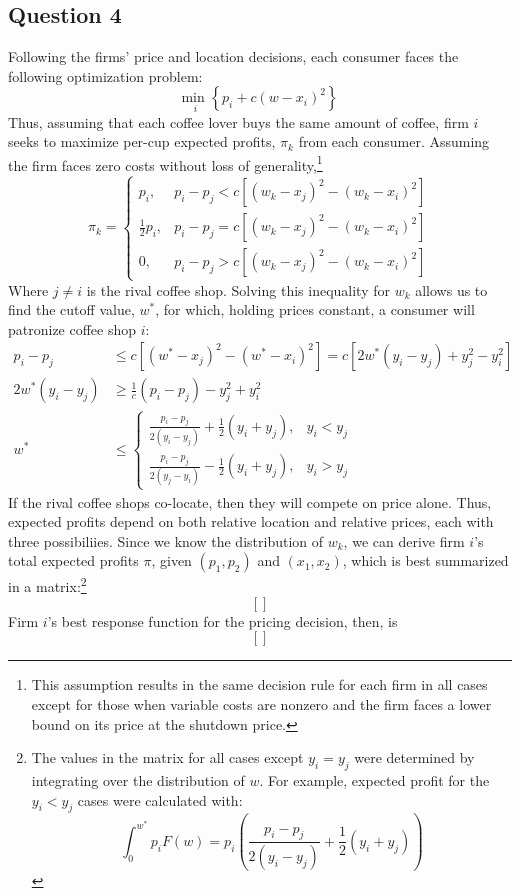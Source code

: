 \documentclass{article}
\newcommand{\usmin}[1]{\underset{#1}{\text{min }}}
\begin{document}
\pagebreak
\subsection*{Question 4}
Following the firms' price and location decisions, each consumer faces the following optimization problem:
\[
	\usmin{i}\left\{p_i + c\left(w-x_i\right)^2\right\}
\]
Thus, assuming that each coffee lover buys the same amount of coffee, firm $i$ seeks to maximize per-cup expected profits, $\pi_k$ from each consumer. Assuming the firm faces zero costs without loss of generality,\footnote{This assumption results in the same decision rule for each firm in all cases except for those when variable costs are nonzero and the firm faces a lower bound on its price at the shutdown price.}
\[
	\pi_k = \begin{cases} 	p_i, & p_i - p_j < c\left[(w_k-x_j)^2 - (w_k-x_i)^2\right] \\ \frac{1}{2}p_i, & p_i - p_j = c\left[(w_k-x_j)^2 - (w_k-x_i)^2\right] \\ 
							0, & p_i - p_j > c\left[(w_k-x_j)^2 - (w_k-x_i)^2\right]	\end{cases}
\]
Where ${j\neq i}$ is the rival coffee shop. Solving this inequality for $w_k$ allows us to find the cutoff value, $w^*$, for which, holding prices constant, a consumer will patronize coffee shop $i$:
\begin{align*}
	p_i - p_j &\leq c\left[(w^*-x_j)^2 - (w^*-x_i)^2\right] = c\left[2w^*(y_i-y_j) + y_j^2-y_i^2\right]	\\
	2w^*(y_i-y_j) &\geq \frac{1}{c}(p_i-p_j) - y_j^2 + y_i^2 	\\
	w^* &\leq 	\begin{cases} 	\frac{p_i - p_j}{2(y_i - y_j)} + \frac{1}{2}(y_i + y_j), & y_i<y_j \\
								\frac{p_i - p_j}{2(y_j - y_i)} - \frac{1}{2}(y_i + y_j), & y_i>y_j
				\end{cases}
\end{align*}
If the rival coffee shops co-locate, then they will compete on price alone. Thus, expected profits depend on both relative location and relative prices, each with three possibiliies. Since we know the distribution of $w_k$, we can derive firm $i$'s total expected profits $\pi$, given $(p_1,p_2)$ and $(x_1,x_2)$, which is best summarized in a matrix:\footnote{The values in the matrix for all cases except ${y_i=y_j}$ were determined by integrating over the distribution of $w$. For example, expected profit for the ${y_i<y_j}$ cases were calculated with: $$ \int_0^{w^*}p_iF(w) = p_i\left(\frac{p_i - p_j}{2(y_i - y_j)} + \frac{1}{2}(y_i + y_j)\right) $$}
\[
	[]
\]
Firm $i$'s best response function for the pricing decision, then, is 
\[
	[]
\]


\end{document}
